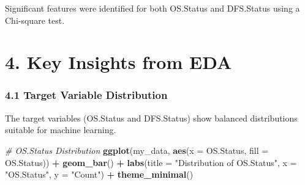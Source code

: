 \documentclass[
]{article}
\newenvironment{Shaded}{\begin{snugshade}}{\end{snugshade}}
\newcommand{\AttributeTok}[1]{\textcolor[rgb]{0.13,0.29,0.53}{#1}}
\newcommand{\CommentTok}[1]{\textcolor[rgb]{0.56,0.35,0.01}{\textit{#1}}}
\newcommand{\ConstantTok}[1]{\textcolor[rgb]{0.56,0.35,0.01}{#1}}
\newcommand{\ControlFlowTok}[1]{\textcolor[rgb]{0.13,0.29,0.53}{\textbf{#1}}}
\newcommand{\DecValTok}[1]{\textcolor[rgb]{0.00,0.00,0.81}{#1}}
\newcommand{\FloatTok}[1]{\textcolor[rgb]{0.00,0.00,0.81}{#1}}
\newcommand{\FunctionTok}[1]{\textcolor[rgb]{0.13,0.29,0.53}{\textbf{#1}}}
\newcommand{\NormalTok}[1]{#1}
\newcommand{\OtherTok}[1]{\textcolor[rgb]{0.56,0.35,0.01}{#1}}
\newcommand{\SpecialCharTok}[1]{\textcolor[rgb]{0.81,0.36,0.00}{\textbf{#1}}}
\newcommand{\StringTok}[1]{\textcolor[rgb]{0.31,0.60,0.02}{#1}}
\begin{document}
Significant features were identified for both OS.Status and DFS.Status
using a Chi-square test.

\begin{Shaded}
\end{Shaded}

\section{4. Key Insights from EDA}\label{key-insights-from-eda}

\subsubsection{\texorpdfstring{\textbf{4.1 Target Variable
Distribution}}{4.1 Target Variable Distribution}}\label{target-variable-distribution}

The target variables (OS.Status and DFS.Status) show balanced
distributions suitable for machine learning.

\begin{Shaded}
\begin{Highlighting}[]
\CommentTok{\# OS.Status Distribution}
\FunctionTok{ggplot}\NormalTok{(my\_data, }\FunctionTok{aes}\NormalTok{(}\AttributeTok{x =}\NormalTok{ OS.Status, }\AttributeTok{fill =}\NormalTok{ OS.Status)) }\SpecialCharTok{+}
  \FunctionTok{geom\_bar}\NormalTok{() }\SpecialCharTok{+}
  \FunctionTok{labs}\NormalTok{(}\AttributeTok{title =} \StringTok{"Distribution of OS.Status"}\NormalTok{, }\AttributeTok{x =} \StringTok{"OS.Status"}\NormalTok{, }\AttributeTok{y =} \StringTok{"Count"}\NormalTok{) }\SpecialCharTok{+}
  \FunctionTok{theme\_minimal}\NormalTok{()}
\end{Highlighting}
\end{Shaded}
\end{document}
